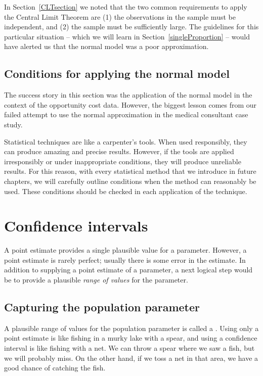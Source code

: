 In Section~\ref{CLTsection} we noted that the two common requirements to apply the Central Limit Theorem are (1) the observations in the sample must be independent, and (2) the sample must be sufficiently large. The guidelines for this particular situation -- which we will learn in Section~\ref{singleProportion} -- would have alerted us that the normal model was a poor approximation.


\subsection{Conditions for applying the normal model}

The success story in this section was the application of the normal model in the context of the opportunity cost data. However, the biggest lesson comes from our failed attempt to use the normal approximation in the medical consultant case study.

Statistical techniques are like a carpenter's tools. When used responsibly, they can produce amazing and precise results. However, if the tools are applied irresponsibly or under inappropriate conditions, they will produce unreliable results. For this reason, with every statistical method that we introduce in future chapters, we will carefully outline conditions when the method can reasonably be used. These conditions should be checked in each application of the technique. %


\section{Confidence intervals}
\label{ConfidenceIntervals}


A point estimate provides a single plausible value for a parameter. However, a point estimate is rarely perfect; usually there is some error in the estimate. In addition to supplying a point estimate of a parameter, a next logical step would be to provide a plausible \emph{range of values} for the parameter.


\subsection{Capturing the population parameter}

A plausible range of values for the population parameter is called a . Using only a point estimate is like fishing in a murky lake with a spear, and using a confidence interval is like fishing with a net. We can throw a spear where we saw a fish, but we will probably miss. On the other hand, if we toss a net in that area, we have a good chance of catching the fish.

